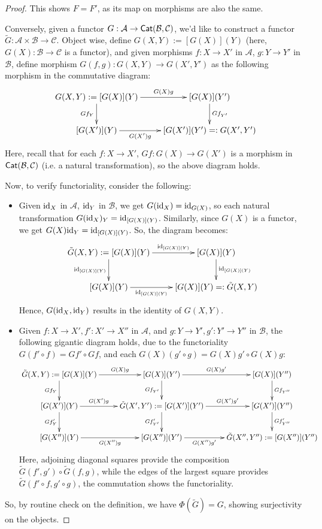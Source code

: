 \documentclass{article}
\begin{document}
\begin{proof}
    This shows $F=F'$, as its map on morphisms are also the same.

    \hfil

    Conversely, given a functor $G:\mathcal{A}\rightarrow\mathsf{Cat}(\mathcal{B},\mathcal{C})$, we'd like to construct a functor $\tilde{G}:\mathcal{A}\times \mathcal{B}\rightarrow\mathcal{C}$. Object wise, define $G(X,Y):= [G(X)](Y)$ (here, $G(X):\mathcal{B}\rightarrow\mathcal{C}$ is a functor), and given morphisms $f:X\rightarrow X'$ in $\mathcal{A}$, $g:Y\rightarrow Y'$ in $\mathcal{B}$, define morphism $G(f,g):G(X,Y)\rightarrow G(X',Y')$ as the following morphism in the commutative diagram:
    \[\xymatrix{
        G(X,Y):=[G(X)](Y) \ar[d]_-{Gf_Y} \ar[r]^-{G(X)g} & [G(X)](Y') \ar[d]^-{Gf_{Y'}}\\
        [G(X')](Y) \ar[r]_-{G(X')g} & [G(X')](Y')=: G(X',Y')
    }\]
    Here, recall that for each $f:X\rightarrow X'$, $Gf:G(X)\rightarrow G(X')$ is a morphism in $\mathsf{Cat}(\mathcal{B},\mathcal{C})$ (i.e. a natural transformation), so the above diagram holds. 

    Now, to verify functoriality, consider the following:
    \begin{itemize}
        \item Given $\mathrm{id}_X$ in $\mathcal{A}$, $\mathrm{id}_Y$ in $\mathcal{B}$, we get $G(\mathrm{id}_X) = \mathrm{id}_{G(X)}$, so each natural transformation $G(\mathrm{id}_X)_Y = \mathrm{id}_{[G(X)](Y)}$. Similarly, since $G(X)$ is a functor, we get $G(X)\mathrm{id}_Y = \mathrm{id}_{[G(X)](Y)}$. So, the diagram becomes:
        \[\xymatrix{
        \tilde{G}(X,Y):=[G(X)](Y) \ar[d]_-{\id_{[G(X)](Y)}} \ar[r]^-{\id_{[G(X)](Y)}} & [G(X)](Y) \ar[d]^-{\id_{[G(X)](Y)}}\\
        [G(X)](Y) \ar[r]_-{\id_{[G(X)](Y)}} & [G(X)](Y)=: \tilde{G}(X,Y)
    }\]
    Hence, $G(\mathrm{id}_X,\mathrm{id}_Y)$ results in the identity of $G(X,Y)$.

        \item Given $f:X\rightarrow X', f':X'\rightarrow X''$ in $\mathcal{A}$, and $g:Y\rightarrow Y', g':Y'\rightarrow Y''$ in $\mathcal{B}$, the following gigantic diagram holds, due to the functoriality $G(f'\circ f)=Gf'\circ Gf$, and each $G(X)(g'\circ g)=G(X)g'\circ G(X)g$:
        \[\xymatrix{
            \tilde{G}(X,Y):= [G(X)](Y) \ar[r]^-{G(X)g} \ar[d]_-{Gf_Y} & [G(X)](Y') \ar[r]^-{G(X)g'} \ar[d]_-{Gf_{Y'}} & [G(X)](Y'') \ar[d]^-{Gf_{Y''}}\\
            [G(X')](Y) \ar[d]_-{Gf'_Y} \ar[r]^-{G(X')g} & \tilde{G}(X',Y'):= [G(X')](Y') \ar[d]_-{Gf'_{Y'}} \ar[r]^-{G(X')g'} & [G(X')](Y'') \ar[d]^-{Gf'_{Y''}}\\
            [G(X'')](Y) \ar[r]_-{G(X'')g} & [G(X'')](Y') \ar[r]_-{G(X'')g'} & \tilde{G}(X'',Y''):=[G(X'')](Y'')
        }\]
        Here, adjoining diagonal squares provide the composition $\tilde{G}(f',g')\circ \tilde{G}(f,g)$, while the edges of the largest square provides $\tilde{G}(f'\circ f, g'\circ g)$, the commutation shows the functoriality.
    \end{itemize}
    So, by routine check on the definition, we have $\Phi(\tilde{G})=G$, showing surjectivity on the objects.


\end{proof}
\end{document}
